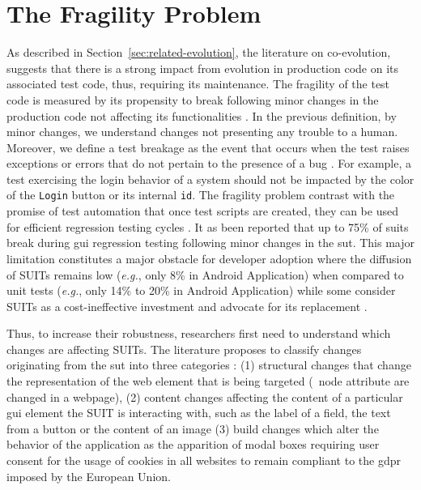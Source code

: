 \section{The Fragility Problem}
\label{sec:related-fragility}

As described in Section~\ref{sec:related-evolution}, the literature on co-evolution, suggests that there is a strong impact from evolution in production code on its associated test code, thus, requiring its maintenance. The fragility of the test code is measured by its propensity to break following minor changes in the production code not affecting its functionalities \cite{Garousi2016, Coppola2019}. In the previous definition, by minor changes, we understand changes not presenting any trouble to a human. Moreover, we define a test breakage as the event that occurs when the test raises exceptions or errors that do not pertain to the presence of a bug \cite{Stocco2018}. For example, a test exercising the login behavior of a system should not be impacted by the color of the \texttt{Login} button or its internal \texttt{id}. The fragility problem contrast with the promise of test automation that once test scripts are created, they can be used for efficient regression testing cycles \cite{Yandrapally2014}.  It as been reported that up to 75\% of \gls{suit}s break during \gls{gui} regression testing \cite{Memon2003a, Grechanik2009, Coppola2016} following minor changes in the \gls{sut}. This major limitation constitutes a major obstacle for developer adoption where the diffusion of SUITs remains low (\emph{e.g.}, only 8\% \cite{Coppola2017, Coppola2019b} in Android Application) when compared to unit tests (\emph{e.g.}, only 14\% \cite{Kochhar2015} to 20\% \cite{Coppola2017, Coppola2019b} in Android Application) while some consider SUITs as a cost-ineffective investment and advocate for its replacement \cite{Vliegendhart2012, Chen2020}.

Thus, to increase their robustness, researchers first need to understand which changes are affecting SUITs. The literature proposes to classify changes originating from the \gls{sut} into three categories \cite{Choudhary2011, Yandrapally2014, Coppola2016}: (1) structural changes that change the representation of the web element that is being targeted (\eg\ node attribute are changed in a webpage), (2) content changes affecting the content of a particular \gls{gui} element the SUIT is interacting with, such as the label of a field, the text from a button or the content of an image (3) build changes which alter the behavior of the application as the apparition of modal boxes requiring user consent for the usage of cookies in all websites to remain compliant to the \gls{gdpr} imposed by the European Union.

